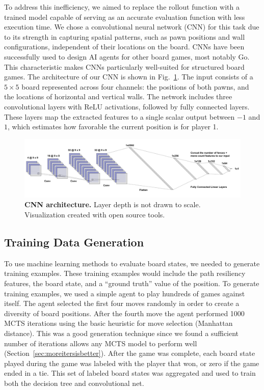 \documentclass[10pt]{article}
\begin{document}
To address this inefficiency, we aimed to replace the rollout function with a trained model capable of serving as an accurate evaluation function with less execution time. We chose a convolutional neural network (CNN) for this task due to its strength in capturing spatial patterns, such as pawn positions and wall configurations, independent of their locations on the board. CNNs have been successfully used to design AI agents for other board games, most notably Go.\cite{silver2016go} This characteristic makes CNNs particularly well-suited for structured board games. The architecture of our CNN is shown in Fig.~\ref{fig:cnn_arch}. The input consists of a $5 \times 5$ board represented across four channels: the positions of both pawns, and the locations of horizontal and vertical walls. The network includes three convolutional layers with ReLU activations, followed by fully connected layers. These layers map the extracted features to a single scalar output between $-1$ and $1$, which estimates how favorable the current position is for player 1.

\begin{figure}[H]
    \centering
    \includegraphics[width=\linewidth]{cnn_arch.png}
    \caption{\textbf{CNN architecture.} Layer depth is not drawn to scale. Visualization created with open source tools.\cite{lenail2019nnsvg}}
    \label{fig:cnn_arch}
\end{figure}
\subsection{Training Data Generation}

To use machine learning methods to evaluate board states, we needed to  generate training examples. These training examples would include the path resiliency features, the board state, and a ``ground truth'' value of the position. To generate training examples, we used a simple agent to play hundreds of games against itself. The agent selected the first four moves randomly in order to create a diversity of board positions. After the fourth move the agent performed 1000 MCTS iterations using the basic heuristic for move selection (Manhattan distance). This was a good generation technique since we found a sufficient number of iterations allows any MCTS model to perform well (Section~\ref{sec:moreitersisbetter}). After the game was complete, each board state played during the game was labeled with the player that won, or zero if the game ended in a tie. This set of labeled board states was aggregated and used to train both the decision tree and convolutional net.
\end{document}
